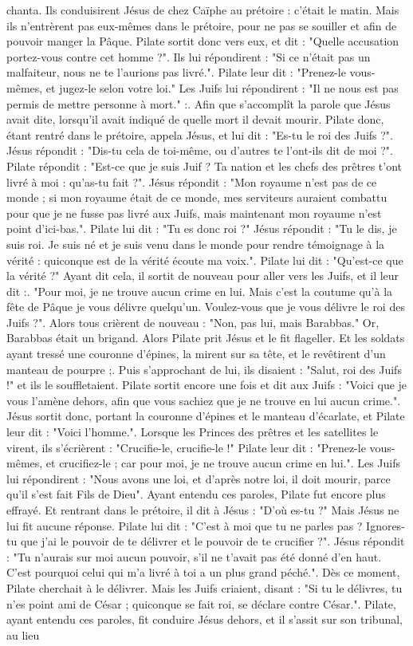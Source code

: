 chanta. Ils conduisirent Jésus de chez Caïphe au prétoire : c’était le matin. Mais ils n’entrèrent pas eux-mêmes dans le prétoire, pour ne pas se souiller et afin de pouvoir manger la Pâque. Pilate sortit donc vers eux, et dit : "Quelle accusation portez-vous contre cet homme ?". Ils lui répondirent : "Si ce n’était pas un malfaiteur, nous ne te l’aurions pas livré.". Pilate leur dit : "Prenez-le vous-mêmes, et jugez-le selon votre loi." Les Juifs lui répondirent : "Il ne nous est pas permis de mettre personne à mort." :. Afin que s’accomplît la parole que Jésus avait dite, lorsqu’il avait indiqué de quelle mort il devait mourir. Pilate donc, étant rentré dans le prétoire, appela Jésus, et lui dit : "Es-tu le roi des Juifs ?". Jésus répondit : "Dis-tu cela de toi-même, ou d’autres te l’ont-ils dit de moi ?". Pilate répondit : "Est-ce que je suis Juif ? Ta nation et les chefs des prêtres t’ont livré à moi : qu’as-tu fait ?". Jésus répondit : "Mon royaume n’est pas de ce monde ; si mon royaume était de ce monde, mes serviteurs auraient combattu pour que je ne fusse pas livré aux Juifs, mais maintenant mon royaume n’est point d’ici-bas.". Pilate lui dit : "Tu es donc roi ?" Jésus répondit : "Tu le dis, je suis roi. Je suis né et je suis venu dans le monde pour rendre témoignage à la vérité : quiconque est de la vérité écoute ma voix.". Pilate lui dit : "Qu’est-ce que la vérité ?" Ayant dit cela, il sortit de nouveau pour aller vers les Juifs, et il leur dit :. "Pour moi, je ne trouve aucun crime en lui. Mais c’est la coutume qu’à la fête de Pâque je vous délivre quelqu’un. Voulez-vous que je vous délivre le roi des Juifs ?". Alors tous crièrent de nouveau : "Non, pas lui, mais Barabbas." Or, Barabbas était un brigand. Alors Pilate prit Jésus et le fit flageller. Et les soldats ayant tressé une couronne d’épines, la mirent sur sa tête, et le revêtirent d’un manteau de pourpre ;. Puis s’approchant de lui, ils disaient : "Salut, roi des Juifs !" et ils le souffletaient. Pilate sortit encore une fois et dit aux Juifs : "Voici que je vous l’amène dehors, afin que vous sachiez que je ne trouve en lui aucun crime.". Jésus sortit donc, portant la couronne d’épines et le manteau d’écarlate, et Pilate leur dit : "Voici l’homme.". Lorsque les Princes des prêtres et les satellites le virent, ils s’écrièrent : "Crucifie-le, crucifie-le !" Pilate leur dit : "Prenez-le vous-mêmes, et crucifiez-le ; car pour moi, je ne trouve aucun crime en lui.". Les Juifs lui répondirent : "Nous avons une loi, et d’après notre loi, il doit mourir, parce qu’il s’est fait Fils de Dieu". Ayant entendu ces paroles, Pilate fut encore plus effrayé. Et rentrant dans le prétoire, il dit à Jésus : "D’où es-tu ?" Mais Jésus ne lui fit aucune réponse. Pilate lui dit : "C’est à moi que tu ne parles pas ? Ignores-tu que j’ai le pouvoir de te délivrer et le pouvoir de te crucifier ?". Jésus répondit : "Tu n’aurais sur moi aucun pouvoir, s’il ne t’avait pas été donné d’en haut. C’est pourquoi celui qui m’a livré à toi a un plus grand péché.". Dès ce moment, Pilate cherchait à le délivrer. Mais les Juifs criaient, disant : "Si tu le délivres, tu n’es point ami de César ; quiconque se fait roi, se déclare contre César.". Pilate, ayant entendu ces paroles, fit conduire Jésus dehors, et il s’assit sur son tribunal, au lieu 